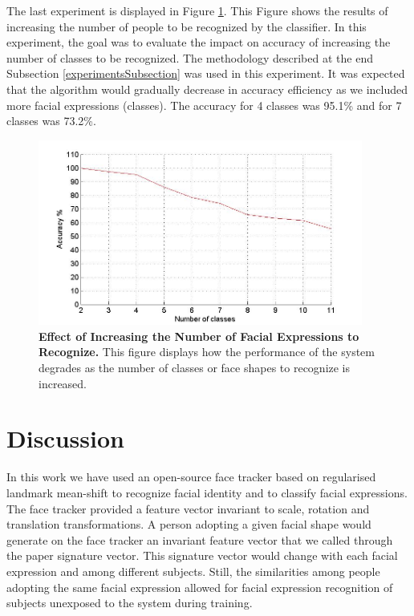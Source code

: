 \documentclass[]{article}
\begin{document}
The last experiment is displayed in Figure \ref{increasingNumberExpressions}. This Figure shows the results of increasing the number
of people to be recognized by the classifier. In this experiment, the goal was to evaluate the impact on accuracy of
increasing  the number of classes to be recognized. The methodology described at the end Subsection
\ref{experimentsSubsection} was used in this experiment. It was expected that the algorithm would gradually decrease in
accuracy efficiency as we included more facial expressions (classes). The accuracy for 4 classes was 95.1\% and for 7
classes was 73.2\%.


\begin{figure}[ht]
\begin{center}
\vspace{-3mm}
\includegraphics[width=0.95\textwidth]{figures/50people_increasing_classes.jpg}
\end{center}
\caption{\textbf{Effect of Increasing the Number of Facial Expressions to Recognize.} This figure displays how the 
performance of the system degrades as the number of classes or face shapes to recognize is increased. }
\label{increasingNumberExpressions}
\end{figure}






\section{Discussion}
In this work we have used an open-source face tracker based on regularised landmark mean-shift to recognize facial
identity and to classify facial expressions. The face tracker provided a feature vector invariant to scale, rotation and
translation transformations. A person adopting a given facial shape would generate on the face tracker an invariant
feature vector that we called through the paper signature vector. This signature vector would change with each facial
expression  and among different subjects. Still, the similarities among people adopting the same facial expression 
allowed for facial expression recognition of subjects unexposed to the system during training.
\end{document}
